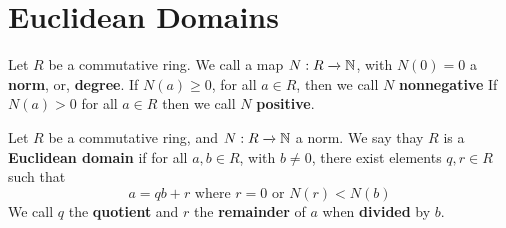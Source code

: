 \section{Euclidean Domains}
\label{section_6.1}

\begin{definition}
  Let $R$ be a commutative ring. We call a map  $N:R \xrightarrow{} \mathbb{N}$, with
  $N(0)=0$ a \textbf{norm}, or, \textbf{degree}. If $N(a) \geq 0$, for all $a
  \in R$, then we call $N$ \textbf{nonnegative} If $N(a)>0$ for all $a \in R$
  then we call  $N$ \textbf{positive}.
\end{definition}

\begin{definition}
  Let $R$ be a commutative ring, and  $N:R \xrightarrow{} \mathbb{N}$ a norm. We say
  thay $R$ is a \textbf{Euclidean domain} if for all $a,b \in R$, with $b \neq
  0$, there exist elements  $q,r \in R$ such that
  \begin{equation*}
    a=qb+r \text{ where } r=0 \text{ or } N(r)<N(b)
  \end{equation*}
  We call $q$ the  \textbf{quotient} and $r$ the  \textbf{remainder} of $a$
  when  \textbf{divided} by $b$.
\end{definition}


